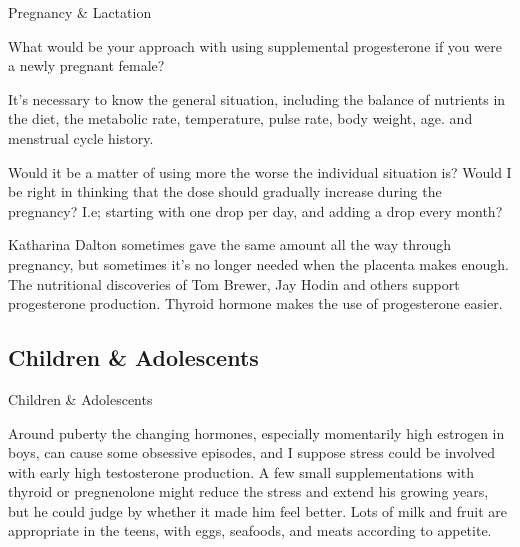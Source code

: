 \documentclass[11pt,oneside,openany,extrafontsizes]{memoir}
\begin{document}
\begin{emailexchange}{Pregnancy \& Lactation}

    \begin{question}
        What would be your approach with using supplemental progesterone if you were a newly pregnant female?
    \end{question}

    \begin{answer}
      It's necessary to know the general situation, including the balance of nutrients in the diet, the metabolic rate, temperature, pulse rate, body weight, age. and menstrual cycle history.
    \end{answer}
	
    \begin{question}
        Would it be a matter of using more the worse the individual situation is? Would I be right in thinking that the dose should gradually increase during the pregnancy? I.e; starting with one drop per day, and adding a drop every month?
    \end{question}

    \begin{answer}
      Katharina Dalton sometimes gave the same amount all the way through pregnancy, but sometimes it's no longer needed when the placenta makes enough. The nutritional discoveries of Tom Brewer, Jay Hodin and others support progesterone production. Thyroid hormone makes the use of progesterone easier.
    \end{answer}
\end{emailexchange}

\subsection{Children \& Adolescents}

\begin{standalonequote}{Children \& Adolescents}

    \begin{answer}
        Around puberty the changing hormones, especially momentarily high estrogen in boys, can cause some obsessive episodes, and I suppose stress could be involved with early high testosterone production. A few small supplementations with thyroid or pregnenolone might reduce the stress and extend his growing years, but he could judge by whether it made him feel better. Lots of milk and fruit are appropriate in the teens, with eggs, seafoods, and meats according to appetite.
    \end{answer}
\end{standalonequote}
\end{document}
